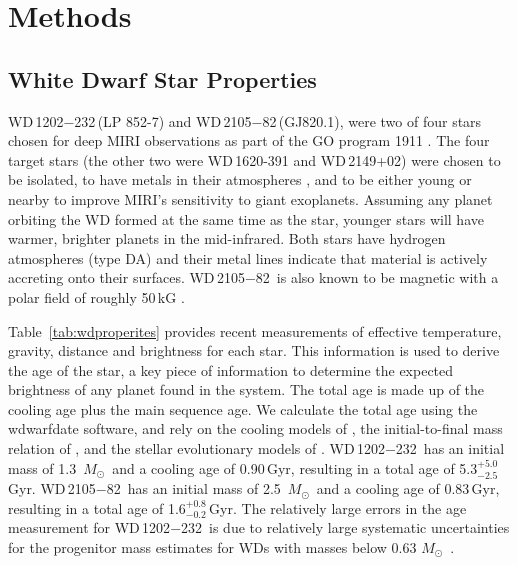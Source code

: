 \documentclass[twocolumn]{aastex631}
\newcommand{\msolar}{\,$M_{\odot}$}
\newcommand{\wdA}{WD\,1202$-$232}
\newcommand{\wdB}{WD\,2105$-$82}
\begin{document}

\section{Methods}
\subsection{White Dwarf Star Properties}
\wdA\,(LP 852-7) and \wdB\,(GJ820.1), were two of four stars chosen for deep MIRI observations as part of the GO program 1911 \citep{Mullally2021jwst.prop.1911M}. The four target stars (the other two were WD\,1620-391 and WD\,2149+02) were chosen to be isolated, to have metals in their atmospheres \citep[][]{Subsavage2017}, and to be either young or nearby to improve MIRI's sensitivity to giant exoplanets. Assuming any planet orbiting the WD formed at the same time as the star, younger stars will have warmer, brighter planets in the mid-infrared. Both stars have hydrogen atmospheres (type DA) and their metal lines indicate that material is actively accreting onto their surfaces. \wdB\, is also known to be magnetic with a polar field of roughly 50\,kG \citep{landstreet12}.

Table~\ref{tab:wdproperites} provides recent measurements of effective temperature, gravity, distance and brightness for each star.  This information is used to derive the age of the star, a key piece of information to determine the expected brightness of any planet found in the system.  The total age is made up of the cooling age plus the main sequence age. We calculate the total age using the wdwarfdate \citep{Kiman2022} software, and rely on the cooling models of \citet{Bedard2020}, the initial-to-final mass relation of \citet{Cummings2018}, and the stellar evolutionary models of \citet{Choi2016}. \wdA\ has an initial mass of 1.3 \msolar\ and a cooling age of 0.90\,Gyr, resulting in a total age of 5.3$^{+5.0}_{-2.5}$ Gyr. \wdB\ has an initial mass of 2.5 \msolar\ and a cooling age of 0.83\,Gyr, resulting in a total age of 1.6$^{+0.8}_{-0.2}$\,Gyr. The relatively large errors in the age measurement for \wdA\ is 
due to relatively large systematic uncertainties for the progenitor mass estimates for WDs with masses below 0.63\,\msolar\ \citep{heintz22}.
\end{document}
